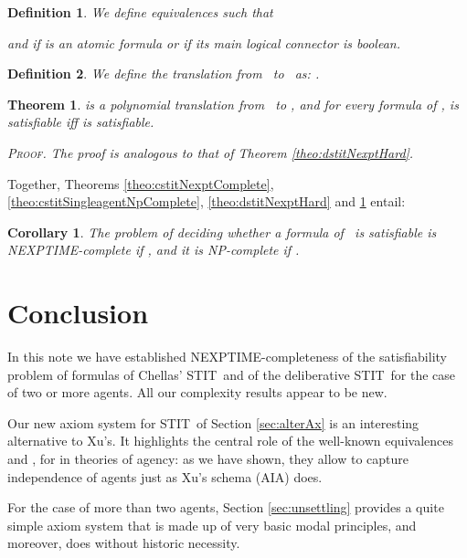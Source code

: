 \documentclass{article}
\newtheorem{definition}{Definition}
\newtheorem{theorem}{Theorem}
\newtheorem{corollary}{Corollary}
\newenvironment{pf}{\em \medskip\noindent \textsc{Proof.}}
{\hspace*{\fill}\nolinebreak[2]\hspace*{\fill}\medskip}
\newcommand{\STIT} {{\textsf{STIT}}}              \newcommand{\CSTIT}{{\textsf{CSTIT}}}            \newcommand{\DSTIT}{{\textsf{DSTIT}}}
\newcommand{\LCSTIT}{}
\newcommand{\LDSTIT}{}
\begin{document}
\begin{definition}
We define equivalences  such that

and  if  is an atomic formula or if its main
logical connector is boolean.
\end{definition}

\begin{definition}
We define the translation  from \LCSTIT\ to \LDSTIT\ as:
.
\end{definition}

\begin{theorem}\label{theo:dstitInNexpt}
 is a polynomial translation from \LCSTIT\ to \LDSTIT, and
for every formula  of \LCSTIT,
 is satisfiable iff  is satisfiable.

\begin{pf}
The proof is analogous to that of Theorem \ref{theo:dstitNexptHard}.
\end{pf}
\end{theorem}

Together, Theorems \ref{theo:cstitNexptComplete}, \ref{theo:cstitSingleagentNpComplete},
\ref{theo:dstitNexptHard} and \ref{theo:dstitInNexpt} entail:

\begin{corollary}
The problem of deciding whether a formula of \LDSTIT\ is satisfiable is
NEXPTIME-complete if , and
it is NP-complete if .
\end{corollary}









\section{Conclusion}\label{sec:conclusion}


In this note we have established NEXPTIME-completeness of the satisfiability problem
of formulas of Chellas' \STIT\ and of the deliberative \STIT\
for the case of two or more agents.
All our complexity results appear to be new.

Our new axiom system for \STIT\ of Section \ref{sec:alterAx}
is an interesting alternative to Xu's.
It highlights the central role of the well-known equivalences
 and
, for 
in theories of agency:
as we have shown, they allow to capture independence of agents just as
Xu's schema (AIA) does.

For the case of more than two agents, Section \ref{sec:unsettling}
provides a quite simple axiom system that is made up of very basic
modal principles, and moreover, does without historic necessity.
\end{document}
